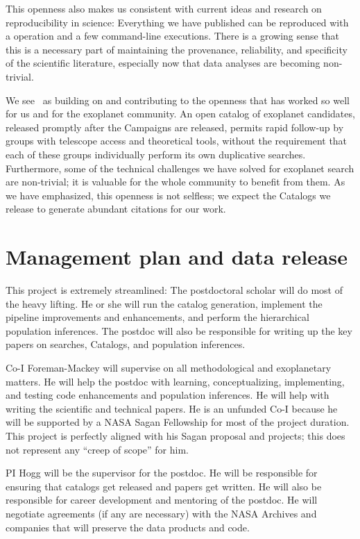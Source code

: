\documentclass[12pt,preprint]{aastex}
\begin{document}
This openness also makes us consistent with current ideas and research
on reproducibility in science:
Everything we have published can be reproduced with a 
operation and a few command-line executions.
There is a growing sense that this is a necessary part of maintaining
the provenance, reliability, and specificity of the scientific literature,
especially now that data analyses are becoming non-trivial.

We see \thecatalog\ as building on and contributing to the openness
that has worked so well for us and for the exoplanet community.
An open catalog of exoplanet candidates, released promptly after
the Campaigns are released, permits rapid follow-up by groups with
telescope access and theoretical tools, without the requirement that
each of these groups individually perform its own duplicative searches.
Furthermore, some of the technical challenges we have solved for
exoplanet search are non-trivial; it is valuable for the whole community
to benefit from them.
As we have emphasized, this openness is not selfless; we expect the
Catalogs we release to generate abundant citations for our work.

\section{Management plan and data release}

This project is extremely streamlined:
The postdoctoral scholar will do most of the heavy lifting.
He or she will run the catalog generation,
implement the pipeline improvements and enhancements,
and perform the hierarchical population inferences.
The postdoc will also be responsible for writing up the key papers
on searches, Catalogs, and population inferences.

Co-I Foreman-Mackey will supervise on all methodological and exoplanetary
matters.
He will help the postdoc with learning, conceptualizing, implementing,
and testing code enhancements and population inferences.
He will help with writing the scientific and technical papers.
He is an unfunded Co-I because he will be supported by a NASA Sagan
Fellowship for most of the project duration.
This project is perfectly aligned with his Sagan proposal and projects;
this does not represent any ``creep of scope'' for him.

PI Hogg will be the supervisor for the postdoc.
He will be responsible for ensuring that catalogs get released and
papers get written.
He will also be responsible for career development and mentoring
of the postdoc.
He will negotiate agreements (if any are necessary) with the NASA
Archives and companies that will preserve the data products and code.
\end{document}
